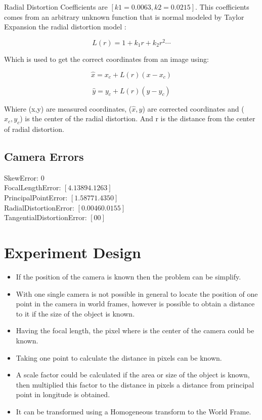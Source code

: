 \documentclass[12pt]{scrartcl}
\begin{document}
Radial Distortion Coefficients are $[k1 = 0.0063, k2 = 0.0215]$. This coefficients comes from an arbitrary unknown function that is normal modeled by Taylor Expansion the radial distortion model \cite{PerceptionSlides}:

\[
	L(r) = 1 + k_1 r + k_2r^{2}\cdots
\]

Which is used to get the correct coordinates from an image using:

\[
	\hat{x} = x_c + L(r) (x - x_c) 
\]

\[
	\hat{y} = y_c + L(r) (y - y_c) 
\]


Whiere (x,y) are measured coordinates, ($\hat{x},\hat{y}$) are corrected coordinates and ($x_c,y_c$) is the center of the radial distortion. And r is the distance from the center of radial distortion.


\subsection*{Camera Errors}

SkewError: 0\\
FocalLengthError: $[4.1389 4.1263]$\\
PrincipalPointError: $[1.5877 1.4350]$\\
RadialDistortionError: $[0.0046 0.0155]$\\
TangentialDistortionError: $[0 0]$\\

\section*{Experiment Design}

\begin{itemize}
	\item If the position of the camera is known then the problem can be simplify.
	\item With one single camera is not possible in general to locate the position of one point in the camera in world frames, however is possible to obtain a distance to it if the size of the object is known.
	\item Having the focal length, the pixel where is the center of the camera could be known.
	\item Taking one point to calculate the distance in pixels can be known.
	\item A scale factor could be calculated if the area or size of the object is known, then multiplied this factor to the distance in pixels a distance from principal point in longitude is obtained.
	\item It can be transformed using a Homogeneous transform to the World Frame.
\end{itemize}
\end{document}
